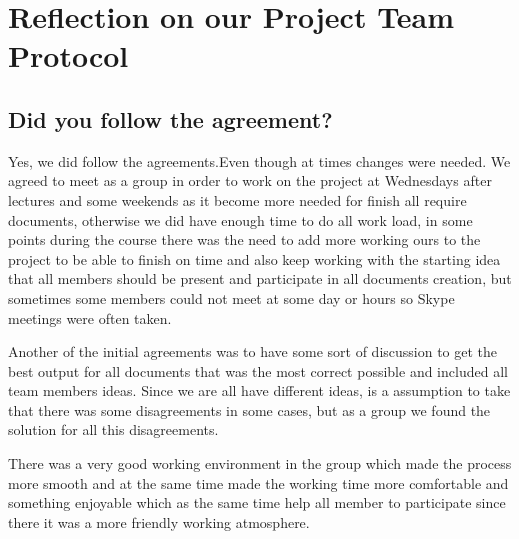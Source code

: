 \section*{Reflection on our Project Team Protocol}

\subsection*{Did you follow the agreement?}
 

Yes, we did follow the agreements.Even though at times changes were needed. We agreed to meet as a group in order to work on the project at Wednesdays after lectures and some weekends as it become more needed for finish all require documents, otherwise we did have enough time to do all work load, in some points during the course there was the need to add more working ours to the project to be able to finish on time and also keep working with the starting idea that all members should be present and participate in all documents creation, but sometimes some members could not meet at some day or hours so Skype meetings were often taken.



Another of the initial agreements was to have some sort of discussion to get the best output for all documents that was the most correct possible and included all team members ideas. Since we are all have different ideas, is a assumption to take that there was some disagreements in some cases, but as a group we found the solution for all this disagreements.
  

There was a very good working environment in the group which made the process more smooth and at the same time made the working time more comfortable and something enjoyable which as the same time help all member to participate since there it was a more friendly working atmosphere. 


